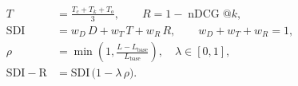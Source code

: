 \begin{align}
T &= \frac{T_c + T_k + T_o}{3}, \qquad
R = 1 - \operatorname{nDCG}@k, \label{eq:trace_retrieval}\\[2pt]
\mathrm{SDI} &= w_D\,D + w_T\,T + w_R\,R, \qquad
w_D + w_T + w_R = 1, \label{eq:sdi}\\[2pt]
\rho &= \min\!\left(1, \frac{L - L_{\mathrm{base}}}{L_{\mathrm{base}}}\right), \quad
\lambda \in [0,1], \label{eq:rho}\\[2pt]
\mathrm{SDI\!-\!R} &= \mathrm{SDI}\,\bigl(1 - \lambda\,\rho\bigr). \label{eq:sdir}
\end{align}

